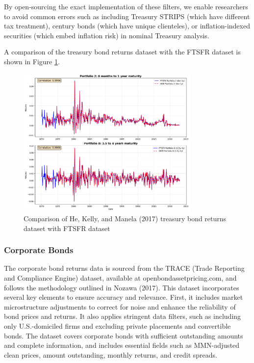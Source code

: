 \documentclass{article}
\begin{document}
\begin{appendices}
By open-sourcing the exact implementation of these filters, we enable researchers to avoid common errors such as including Treasury STRIPS (which have different tax treatment), century bonds (which have unique clienteles), or inflation-indexed securities (which embed inflation risk) in nominal Treasury analysis.

A comparison of the treasury bond returns dataset with the FTSFR dataset is shown in Figure \ref{fig:us_treasury_returns_comparison}.

\begin{figure}[h]
  \centering
  \includegraphics[width=0.8\textwidth]{../docs_src/us_treasury_compare.png}
  \caption{Comparison of He, Kelly, and Manela (2017) treasury bond returns dataset with FTSFR dataset}
  \label{fig:us_treasury_returns_comparison}
\end{figure}

\subsubsection{Corporate Bonds}
\label{sec:corporate_bonds}

The corporate bond returns data is sourced from the TRACE (Trade Reporting and Compliance Engine) dataset, available at openbondassetpricing.com, and follows the methodology outlined in Nozawa (2017). This dataset incorporates several key elements to ensure accuracy and relevance. First, it includes market microstructure adjustments to correct for noise and enhance the reliability of bond prices and returns. It also applies stringent data filters, such as including only U.S.-domiciled firms and excluding private placements and convertible bonds. The dataset covers corporate bonds with sufficient outstanding amounts and complete information, and includes essential fields such as MMN-adjusted clean prices, amount outstanding, monthly returns, and credit spreads.


\end{appendices}
\end{document}
